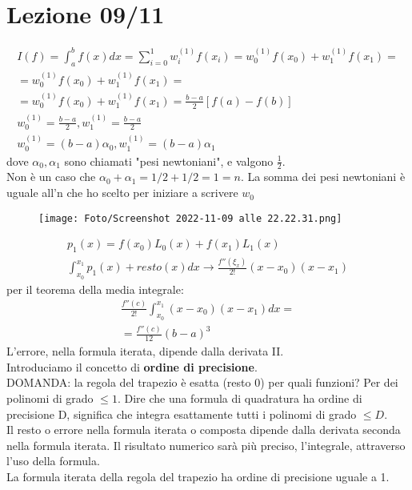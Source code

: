 \documentclass[a4paper, portrait]{book}
\numberwithin{equation}{chapter} %
\begin{document}
\chapter{Lezione 09/11}
\begin{gather}
    I(f) = \int_a^b f(x) dx = \sum_{i=0}^1 w_i^{(1)}f(x_i) = w_0^{(1)}f(x_0) + w_1^{(1)}f(x_1) = \\
    = w_0^{(1)}f(x_0) + w_1^{(1)} f(x_1) = \\
    = w_0^{(1)}f(x_0) + w_1^{(1)}f(x_1) = \frac{b-a}{2}[f(a)-f(b)]\\
    w_0^{(1)} = \frac{b-a}{2}, w_1^{(1)} = \frac{b-a}{2}\\
    w_0^{(1)} = (b-a)\alpha_0, w_1^{(1)} = (b-a)\alpha_1
\end{gather}
dove $\alpha_0, \alpha_1$ sono chiamati "pesi newtoniani", e valgono $\frac{1}{2}$.\\
Non è un caso che $\alpha_0 + \alpha_1 = 1/2 + 1/2 = 1 = n$. La somma dei pesi newtoniani è uguale all'n che ho scelto per iniziare a scrivere $w_0$
\begin{figure}[h!]
    \centering
    \texttt{[image: Foto/Screenshot 2022-11-09 alle 22.22.31.png]}
    \caption{}
\end{figure}
\begin{gather}
    p_1(x) = f(x_0)L_0(x) + f(x_1)L_1(x)\\
    \int_{x_0}^{x_1}p_1(x) + resto(x) dx \rightarrow \frac{f''(\xi_x)}{2!}(x-x_0)(x-x_1)
\end{gather}
per il teorema della media integrale:
\begin{gather}
    \frac{f''(c)}{2!}\int_{x_0}^{x_1}(x-x_0)(x-x_1) dx = \\
    = \frac{f''(c)}{12} (b-a)^3
\end{gather}
L'errore, nella formula iterata, dipende dalla derivata II.\\
Introduciamo il concetto di \textbf{ordine di precisione}.\\
DOMANDA: la regola del trapezio è esatta (resto 0) per quali funzioni? Per dei polinomi di grado $\leq 1$. Dire che una formula di quadratura ha ordine di precisione D, significa che integra esattamente tutti i polinomi di grado $\leq D$.\\
Il resto o errore nella formula iterata o composta dipende dalla derivata seconda nella formula iterata. Il risultato numerico sarà più preciso, l'integrale, attraverso l'uso della formula.\\
La formula iterata della regola del trapezio ha ordine di precisione uguale a 1.
\end{document}

